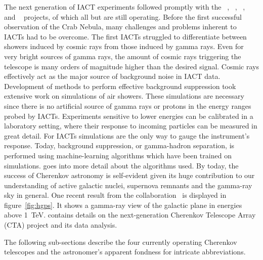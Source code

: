 The next generation of IACT experiments followed promptly with the \hegra~\cite{hegra-crab-data}, \magic~\cite{magic}, \hess~\cite{hess}, \veritas~\cite{veritas} 
and \fact~\cite{fact} projects, of which all but \hegra are still operating.
Before the first successful observation of the Crab Nebula, many challenges and problems inherent to IACTs had to be overcome. 
The first IACTs struggled to differentiate between showers induced by cosmic rays from those induced by gamma rays. 
Even for very bright sources of gamma rays, the amount of cosmic rays triggering 
the telescope is many orders of magnitude higher than the desired signal. Cosmic rays effectively act as the major 
source of background noise in IACT data. 
Development of methods to perform effective background suppression took extensive work on simulations of air showers. 
These simulations are necessary since there is no artificial source of gamma rays or protons 
in the energy ranges probed by IACTs. Experiments sensitive to lower energies can be calibrated in a laboratory setting, where their response 
to incoming particles can be measured in great detail. For IACTs simulations are the only way to gauge the instrument's response.
Today, background suppression, or gamma-hadron separation, is performed using machine-learning algorithms which have been trained 
on simulations.  goes into more detail about the algorithms used.
By today, the success of Cherenkov astronomy is self-evident given its huge 
contribution to our understanding of active galactic nuclei, supernova remnants and the gamma-ray sky in general. One recent result from the 
\hess collaboration~\cite{hess_gps} is displayed in figure~\ref{fig:hgps}. It shows a gamma-ray view of the galactic plane 
in energies above \SI{1}{TeV}. 
 contains details on the next-generation Cherenkov Telescope Array (CTA) project and its data analysis.

The following sub-sections describe the four currently operating Cherenkov telescopes and the astronomer's apparent fondness for intricate 
abbreviations.

